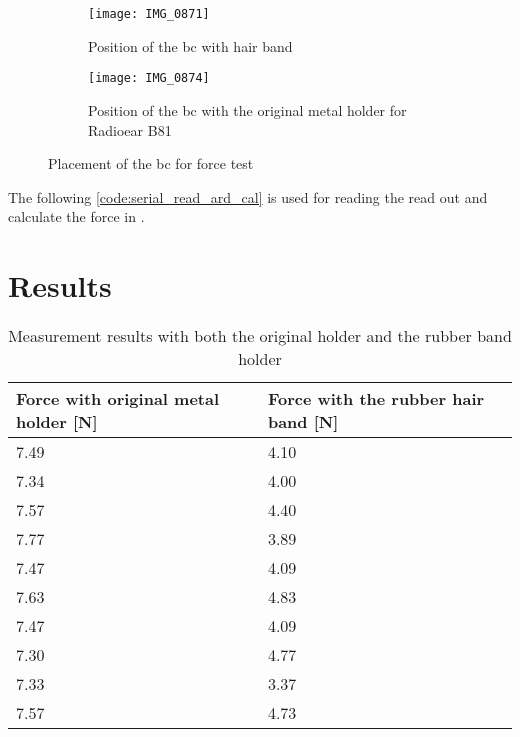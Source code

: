 \begin{figure}[H]
\centering
\begin{subfigure}[htbp]{0.33\textwidth}
		\texttt{[image: IMG\_0871]}
		\caption{Position of the \gls{bc} with hair band}
		\label{fig:bc_hair_band}
\end{subfigure}\vspace{10pt}
\begin{subfigure}[htbp]{0.60\textwidth}
		\texttt{[image: IMG\_0874]}
		\caption{Position of the \gls{bc} with the original metal holder for Radioear B81}
		\label{fig:bc_metal_holder}
\end{subfigure} \hspace{10pt}
\caption{Placement of the \gls{bc} for force test}
\label{fig:bc_holder}
\end{figure}


The following \autoref{code:serial_read_ard_cal} is used for reading the read out and calculate the force in \matlab.



\section*{Results}


\begin{table}[H]
\centering
\caption{Measurement results with both the original holder and the rubber band holder}
\label{apend:weight_result}
\begin{tabular}{l|l}
Force with original metal holder [\si{\newton}] & Force with the rubber hair band [\si{\newton}] \\ \hline
7.49                                           & 4.10                                          \\
7.34                                           & 4.00                                          \\
7.57                                           & 4.40                                          \\
7.77                                           & 3.89                                          \\
7.47                                           & 4.09                                          \\
7.63                                           & 4.83                                          \\
7.47                                           & 4.09                                          \\
7.30                                           & 4.77                                          \\
7.33                                           & 3.37                                          \\
7.57                                           & 4.73                                         
\end{tabular}
\end{table}

